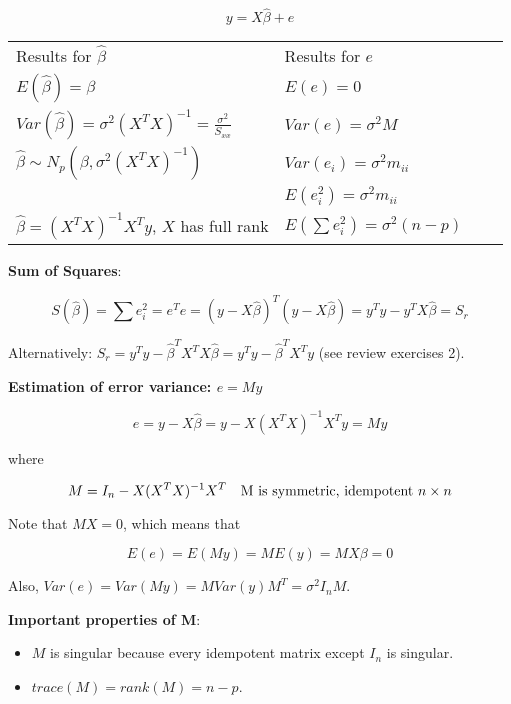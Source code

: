 \begin{equation}
y = X\hat{\beta} + e
\end{equation}

\begin{tabular}{@{}ll@{}ll@{}}
Results for $\hat{\beta}$ & Results for $e$\\
$E(\hat{\beta}) = \beta$ & $E(e) = 0$\\
$Var(\hat{\beta}) = \sigma^2 (X^T X)^{-1} = \frac{\sigma^2}{S_{xx}}$ & $Var(e)=\sigma^2 M$  \\
$\hat{\beta} \sim N_p(\beta,\sigma^2 (X^T X)^{-1})$ & $Var(e_i)=\sigma^2 m_{ii} $\\ 
&  $E(e_i^2)= \sigma^2 m_{ii}$\\
$\hat{\beta} = (X^T X)^{-1} X^T y$, $X$ has full rank  & $E(\sum e_i^2) = \sigma^2 (n-p)$\\
\end{tabular}

\medskip
\textbf{Sum of Squares}:

\begin{equation}
S(\hat{\beta}) = \sum e_i^2 = e^T e = (y-X\hat{\beta})^T (y-X\hat{\beta})  = y^T y - y^T X \hat{\beta} = S_r
\end{equation}

Alternatively: $S_r= y^Ty - \hat{\beta}^T X^T X\hat{\beta}=y^Ty - \hat{\beta}^T X^T y$ (see review exercises 2).

\textbf{Estimation of error variance: $e=My$}

\begin{equation}
e = y - X\hat{\beta} = y - X (X^T X)^{-1} X^T y = My
\end{equation}

\noindent
where

\begin{equation}
M = I_n -  X (X^T X)^{-1} X^T \quad \hbox{M is symmetric, idempotent } n\times n
\end{equation}

Note that $MX=0$, which means that 

\begin{equation}
E(e)=E(My) = ME(y)= MX\beta = 0
\end{equation}

Also, $Var(e) = Var(My) = M Var(y) M^T = \sigma^2 I_n M$.

\medskip
\textbf{Important properties of M}:

\begin{itemize}
\item $M$ is singular because every idempotent matrix except $I_n$ is singular.
\item $trace(M)=rank(M)=n-p$.
\end{itemize}

